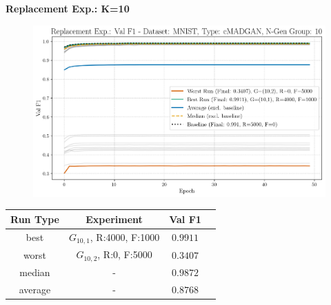 \noindent\textbf{Replacement Exp.: K=10}
\begin{figure}[htbp]
	\centering
	\includegraphics[width=.85\textwidth]{abb/strat_classifier_performance/MNIST_STRATIFIED_CLASSIFIERS_cMADGAN_NEW/replacement_experiments/val_f1_score_cMADGAN_MNIST_n_gen_10_all.png}
	\label{fig:app_strat_class_performance_replacement_exp._val_f1_score_10}
\end{figure}
\begin{table}[H]
	\vspace{-1em}
	\centering
	\begin{tabular}{|c|c|c|c|}
		\hline
		Run Type & Experiment & Val F1 \\ \hline
		best & \(G_{10, 1}\), R:4000, F:1000 & $0.9911$\\ \hline
		worst & \(G_{10, 2}\), R:0, F:5000 & $0.3407$\\ \hline
		median & - & $0.9872$\\ \hline
		average & - & $0.8768$
		\\ \hline
	\end{tabular}
\end{table}
\newpage
